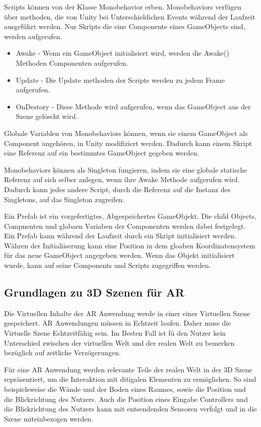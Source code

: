 Scripts können von der Klasse Monobehavior erben. Monobehaviors verfügen über methoden, die von Unity bei Unterschieldichen Events während der Laufzeit ausgeführt werden. Nur Skripts die eine Componente eines GameObjects sind, werden aufgerufen.

\begin{itemize}
	\item Awake - Wenn ein GameObject initialisiert wird, werden die Awake() Methoden Componenten aufgerufen.
	\item Update - Die Update methoden der Scripts werden zu jedem Frame aufgerufen.
	\item OnDestory - Diese Methode wird aufgerufen, wenn das GameObject aus der Szene gelöscht wird.
\end{itemize}

Globale Variablen von Monobehaviors können, wenn sie einem GameObject als Component angehören, in Unity modifiziert werden. Dadurch kann einem Skript eine Referenz auf ein bestimmtes GameObject gegeben werden.

Monobehaviors können als Singleton fungieren, indem sie eine globale statische Referenz auf sich selber anlegen, wenn ihre Awake Methode aufgerufen wird. Dadurch kann jedes andere Script, durch die Referenz auf die Instanz des Singletons, auf das Singleton zugreifen.

Ein Prefab ist ein vorgefertigtes, Abgespeichertes GameObjekt. Die child Objects, Compnenten und globaen Variaben der Componenten werden dabei festgelegt. Ein Prefab kann während der Laufzeit durch ein Skript initialisiert werden. Währen der Initialiiserung kann eine Position in dem gloaben Koordinatensystem für das neue GameObject angegeben werden. Wenn das Objekt initialisiert wurde, kann auf seine Components und Scripts zugegriffen werden.
\subsection{Grundlagen zu 3D Szenen für AR}


Die Virtuellen Inhalte der AR Anwendung werde in einer einer Virtuellen Szene gespeichert. 
AR Anwendungen müssen in Echtzeit laufen. Daher muss die Virtuelle Szene Echtzeitfähig sein.
Im Besten Fall ist fü den Nutzer kein Unterschied zwischen der virtuellen Welt und der realen Welt zu bemerken bezüglich auf zeitliche Verzögerungen.

Für eine AR Anwendung werden relevante Teile der realen Welt in der 3D Szene repräsentiert, um die Interaktion mit ditigalen Elementen zu ermöglichen.
So sind beispielsweise die Wände und der Boden eines Raumes, sowie die Position und die Blickrichtung des Nutzers. Auch die Position eines Eingabe Controllers und die Blickrichtung des Nutzers kann mit entsendenden Sensoren verfolgt und in die Szene miteinbezogen werden.


